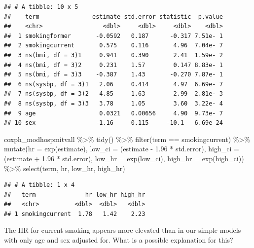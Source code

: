 \documentclass[
]{book}
\newenvironment{Shaded}{\begin{snugshade}}{\end{snugshade}}
\newcommand{\AttributeTok}[1]{\textcolor[rgb]{0.77,0.63,0.00}{#1}}
\newcommand{\FloatTok}[1]{\textcolor[rgb]{0.00,0.00,0.81}{#1}}
\newcommand{\FunctionTok}[1]{\textcolor[rgb]{0.00,0.00,0.00}{#1}}
\newcommand{\NormalTok}[1]{#1}
\newcommand{\SpecialCharTok}[1]{\textcolor[rgb]{0.00,0.00,0.00}{#1}}
\newcommand{\StringTok}[1]{\textcolor[rgb]{0.31,0.60,0.02}{#1}}
\begin{document}
\begin{verbatim}
## # A tibble: 10 x 5
##    term               estimate std.error statistic  p.value
##    <chr>                 <dbl>     <dbl>     <dbl>    <dbl>
##  1 smokingformer       -0.0592   0.187      -0.317 7.51e- 1
##  2 smokingcurrent       0.575    0.116       4.96  7.04e- 7
##  3 ns(bmi, df = 3)1     0.941    0.390       2.41  1.59e- 2
##  4 ns(bmi, df = 3)2     0.231    1.57        0.147 8.83e- 1
##  5 ns(bmi, df = 3)3    -0.387    1.43       -0.270 7.87e- 1
##  6 ns(sysbp, df = 3)1   2.06     0.414       4.97  6.69e- 7
##  7 ns(sysbp, df = 3)2   4.85     1.63        2.99  2.81e- 3
##  8 ns(sysbp, df = 3)3   3.78     1.05        3.60  3.22e- 4
##  9 age                  0.0321   0.00656     4.90  9.73e- 7
## 10 sex                 -1.16     0.115     -10.1   6.69e-24
\end{verbatim}

\begin{Shaded}
\begin{Highlighting}[]
\NormalTok{coxph\_modhospmitvall }\SpecialCharTok{\%\textgreater{}\%} 
  \FunctionTok{tidy}\NormalTok{() }\SpecialCharTok{\%\textgreater{}\%} 
  \FunctionTok{filter}\NormalTok{(term }\SpecialCharTok{==} \StringTok{\textquotesingle{}smokingcurrent\textquotesingle{}}\NormalTok{) }\SpecialCharTok{\%\textgreater{}\%}
  \FunctionTok{mutate}\NormalTok{(}\AttributeTok{hr =} \FunctionTok{exp}\NormalTok{(estimate),}
         \AttributeTok{low\_ci =}\NormalTok{ (estimate }\SpecialCharTok{{-}} \FloatTok{1.96} \SpecialCharTok{*}\NormalTok{ std.error), }
         \AttributeTok{high\_ci =}\NormalTok{ (estimate }\SpecialCharTok{+} \FloatTok{1.96} \SpecialCharTok{*}\NormalTok{ std.error), }
         \AttributeTok{low\_hr =} \FunctionTok{exp}\NormalTok{(low\_ci), }
         \AttributeTok{high\_hr =} \FunctionTok{exp}\NormalTok{(high\_ci)) }\SpecialCharTok{\%\textgreater{}\%} 
  \FunctionTok{select}\NormalTok{(term, hr, low\_hr, high\_hr)}
\end{Highlighting}
\end{Shaded}

\begin{verbatim}
## # A tibble: 1 x 4
##   term              hr low_hr high_hr
##   <chr>          <dbl>  <dbl>   <dbl>
## 1 smokingcurrent  1.78   1.42    2.23
\end{verbatim}

The HR for current smoking appears more elevated than in our simple models with only age and sex adjusted for. What is a possible explanation for this?
\end{document}

